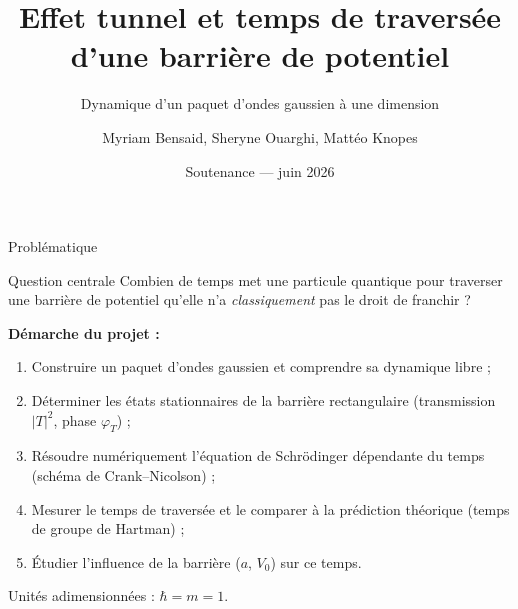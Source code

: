 \documentclass[10pt,aspectratio=169]{beamer}
\title[Effet tunnel et temps de traversée]
      {Effet tunnel et temps de traversée\\d'une barrière de potentiel}
\subtitle{Dynamique d'un paquet d'ondes gaussien à une dimension}
\author{Myriam Bensaid, Sheryne Ouarghi, Mattéo Knopes}
\institute{Projet numérique — Physique moderne 2025--2026}
\date{Soutenance — juin 2026}
\newcommand{\hb}{\hbar}
\begin{document}
\begin{frame}
  \titlepage
\end{frame}

\begin{frame}{Problématique}
  \begin{block}{Question centrale}
    Combien de temps met une particule quantique pour traverser une
    barrière de potentiel qu'elle n'a \emph{classiquement} pas le droit de franchir ?
  \end{block}
  \vspace{0.5em}
  \textbf{Démarche du projet :}
  \begin{enumerate}
    \item Construire un paquet d'ondes gaussien et comprendre sa dynamique libre ;
    \item Déterminer les états stationnaires de la barrière rectangulaire
          (transmission $|T|^2$, phase $\varphi_T$) ;
    \item Résoudre numériquement l'équation de Schrödinger dépendante du temps
          (schéma de Crank--Nicolson) ;
    \item Mesurer le temps de traversée et le comparer à la prédiction
          théorique (temps de groupe de Hartman) ;
    \item Étudier l'influence de la barrière ($a$, $V_0$) sur ce temps.
  \end{enumerate}
  \vspace{0.5em}
  Unités adimensionnées : $\hb = m = 1$.
\end{frame}
\end{document}
